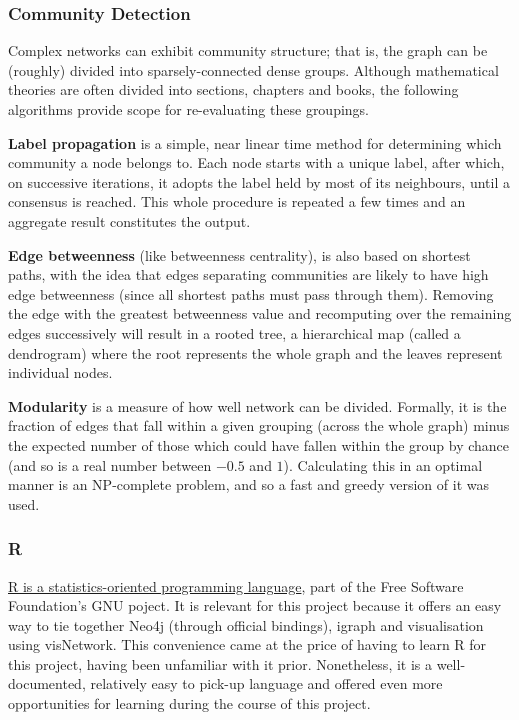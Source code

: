 \subsubsection{Community Detection}

Complex networks can exhibit community structure; that is, the graph can be
(roughly) divided into sparsely-connected dense groups. Although mathematical
theories are often divided into sections, chapters and books, the following
algorithms provide scope for re-evaluating these groupings.

\textbf{Label propagation} is a simple, near linear time method for
determining which community a node belongs to. Each node starts with a unique
label, after which, on successive iterations, it adopts the label held by most
of its neighbours, until a consensus is reached. This whole procedure is
repeated a few times and an aggregate result constitutes the
output.~\cite{raghavan2007}

\textbf{Edge betweenness} (like betweenness centrality), is also based on
shortest paths, with the idea that edges separating communities are likely to
have high edge betweenness (since all shortest paths must pass through them).
Removing the edge with the greatest betweenness value and recomputing over the
remaining edges successively will result in a rooted tree, a hierarchical map
(called a dendrogram) where the root represents the whole graph and the leaves
represent individual nodes.~\cite{newman2004}

\textbf{Modularity} is a measure of how well network can be divided.
Formally, it is the fraction of edges that fall within a given grouping
(across the whole graph) minus the expected number of those which could have
fallen within the group by chance (and so is a real number between $-0.5$ and
$1$). Calculating this in an optimal manner is an NP-complete problem, and so
a fast and greedy version of it was used.~\cite{clauset2004}


\subsubsection{R}

\href{http://www.r-project.org}{R is a statistics-oriented programming language},
part of the Free Software Foundation's GNU poject. It is relevant for this
project because it offers an easy way to tie together Neo4j (through official
bindings), igraph and visualisation using visNetwork. This convenience came at
the price of having to learn R for this project, having been unfamiliar with it
prior. Nonetheless, it is a well-documented, relatively easy to pick-up language
and offered even more opportunities for learning during the course of this
project.

